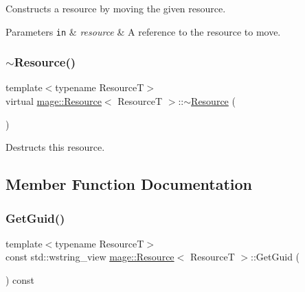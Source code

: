 Constructs a resource by moving the given resource.


\begin{DoxyParams}[1]{Parameters}
\mbox{\tt in}  & {\em resource} & A reference to the resource to move. \\
\hline
\end{DoxyParams}
\mbox{\label{classmage_1_1_resource_a56a3ac799224e100b271b65ec455b59e}} 
\subsubsection{\texorpdfstring{$\sim$\+Resource()}{~Resource()}}
{\footnotesize\ttfamily template$<$typename ResourceT$>$ \\
virtual \mbox{\hyperlink{classmage_1_1_resource}{mage\+::\+Resource}}$<$ ResourceT $>$\+::$\sim$\mbox{\hyperlink{classmage_1_1_resource}{Resource}} (\begin{DoxyParamCaption}{ }\end{DoxyParamCaption})\hspace{0.3cm}{\ttfamily [virtual]}}

Destructs this resource. 

\subsection{Member Function Documentation}
\mbox{\label{classmage_1_1_resource_ac92abd799e0df35014c849be6f7a04eb}} 
\subsubsection{\texorpdfstring{Get\+Guid()}{GetGuid()}}
{\footnotesize\ttfamily template$<$typename ResourceT$>$ \\
const std\+::wstring\+\_\+view \mbox{\hyperlink{classmage_1_1_resource}{mage\+::\+Resource}}$<$ ResourceT $>$\+::Get\+Guid (\begin{DoxyParamCaption}{ }\end{DoxyParamCaption}) const\hspace{0.3cm}{\ttfamily [noexcept]}}

